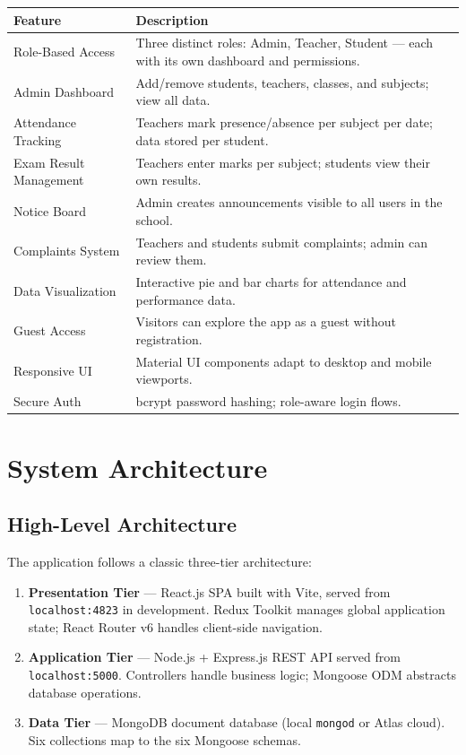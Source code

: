\documentclass[12pt,a4paper]{report}
\begin{document}
\begin{longtable}{@{}p{4.5cm}p{10cm}@{}}
  \toprule
  \textbf{Feature} & \textbf{Description} \\
  \midrule
  \endhead
  Role-Based Access & Three distinct roles: Admin, Teacher, Student — each with its own dashboard and permissions. \\[4pt]
  Admin Dashboard & Add/remove students, teachers, classes, and subjects; view all data. \\[4pt]
  Attendance Tracking & Teachers mark presence/absence per subject per date; data stored per student. \\[4pt]
  Exam Result Management & Teachers enter marks per subject; students view their own results. \\[4pt]
  Notice Board & Admin creates announcements visible to all users in the school. \\[4pt]
  Complaints System & Teachers and students submit complaints; admin can review them. \\[4pt]
  Data Visualization & Interactive pie and bar charts for attendance and performance data. \\[4pt]
  Guest Access & Visitors can explore the app as a guest without registration. \\[4pt]
  Responsive UI & Material UI components adapt to desktop and mobile viewports. \\[4pt]
  Secure Auth & bcrypt password hashing; role-aware login flows. \\
  \bottomrule
\end{longtable}

\chapter{System Architecture}

\section{High-Level Architecture}

The application follows a classic three-tier architecture:

\begin{enumerate}[leftmargin=2em]
  \item \textbf{Presentation Tier} --- React.js SPA built with Vite, served from \texttt{localhost:4823} in development. Redux Toolkit manages global application state; React Router v6 handles client-side navigation.
  \item \textbf{Application Tier} --- Node.js + Express.js REST API served from \texttt{localhost:5000}. Controllers handle business logic; Mongoose ODM abstracts database operations.
  \item \textbf{Data Tier} --- MongoDB document database (local \texttt{mongod} or Atlas cloud). Six collections map to the six Mongoose schemas.
\end{enumerate}
\end{document}
